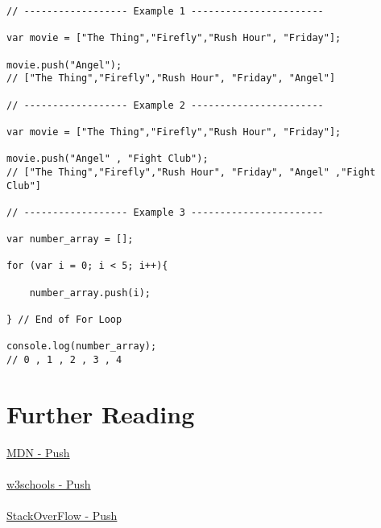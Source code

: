 \documentclass[12pt, letterpaper]{article}
\begin{document}
\begin{lstlisting}
// ------------------ Example 1 -----------------------

var movie = ["The Thing","Firefly","Rush Hour", "Friday"];

movie.push("Angel"); 
// ["The Thing","Firefly","Rush Hour", "Friday", "Angel"]

// ------------------ Example 2 -----------------------

var movie = ["The Thing","Firefly","Rush Hour", "Friday"];

movie.push("Angel" , "Fight Club"); 
// ["The Thing","Firefly","Rush Hour", "Friday", "Angel" ,"Fight Club"]

// ------------------ Example 3 -----------------------

var number_array = [];

for (var i = 0; i < 5; i++){

	number_array.push(i);

} // End of For Loop

console.log(number_array);
// 0 , 1 , 2 , 3 , 4

\end{lstlisting}

\section*{Further Reading}

\href{https://developer.mozilla.org/en-US/docs/Web/JavaScript/Reference/Global_Objects/Array/push}{MDN - Push}\\
\\
\href{http://www.w3schools.com/jsref/jsref_push.asp}{w3schools - Push}\\
\\
\href{http://stackoverflow.com/questions/351409/appending-to-array}{StackOverFlow - Push}
\end{document}
